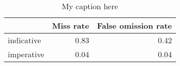 \begin{table}[!ht]
\centering
\begin{tabular}{lrr}
\toprule
{} &  Miss rate &  False omission rate \\
\midrule
indicative &       0.83 &                 0.42 \\
imperative &       0.04 &                 0.04 \\
\bottomrule
\end{tabular}
\caption{My caption here}
\label{tab:MOOD-ocd-combined-errors}
\end{table}